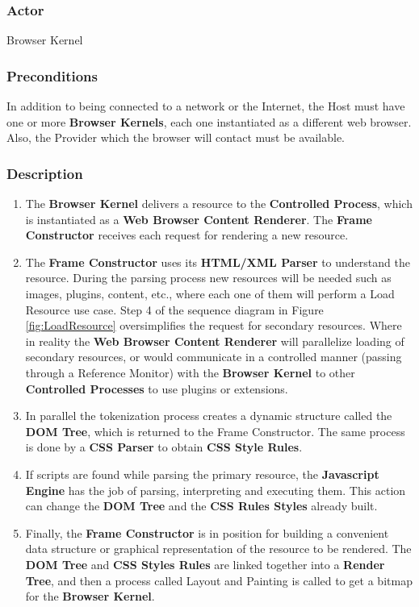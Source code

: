 \documentclass[]{acmlarge}
\begin{document}
    \subsubsection*{Actor} Browser Kernel
    \subsubsection*{Preconditions} In addition to being connected to a network or the Internet, the Host must have one or more \textbf{Browser Kernels}, each one instantiated as a different web browser. Also, the Provider which the browser will contact must be available. 

    \subsubsection*{Description}
      \begin{enumerate}\leftskip2.5em
        \item The \textbf{Browser Kernel} delivers a resource to the \textbf{Controlled Process}, which is instantiated as a \textbf{Web Browser Content Renderer}. The \textbf{Frame Constructor} receives each request for rendering a new resource.
        \item The \textbf{Frame Constructor} uses its \textbf{HTML/XML Parser} to understand the resource. During the parsing process new resources will be needed such as images, plugins, content, etc., where each one of them will perform a Load Resource use case. Step 4 of the sequence diagram in Figure \ref{fig:LoadResource} oversimplifies the request for secondary resources. Where in reality the \textbf{Web Browser Content Renderer} will parallelize loading of secondary resources, or would communicate in a controlled manner (passing through a Reference Monitor) with the \textbf{Browser Kernel} to other \textbf{Controlled Processes} to use plugins or extensions. %
        \item In parallel the tokenization process creates a dynamic structure called the \textbf{DOM Tree}, which is returned to the Frame Constructor. The same process is done by a \textbf{CSS Parser} to obtain \textbf{CSS Style Rules}.
        \item If scripts are found while parsing the primary resource, the \textbf{Javascript Engine} has the job of parsing, interpreting and executing them. This action can change the \textbf{DOM Tree} and the \textbf{CSS Rules Styles} already built.
        \item Finally, the \textbf{Frame Constructor} is in position for building a convenient data structure or graphical representation of the resource to be rendered. The \textbf{DOM Tree} and \textbf{CSS Styles Rules} are linked together into a \textbf{Render Tree}, and then a process called Layout and Painting is called to get a bitmap \cite{gpuchrome,gecko2} for the \textbf{Browser Kernel}.
      \end{enumerate}
\end{document}

